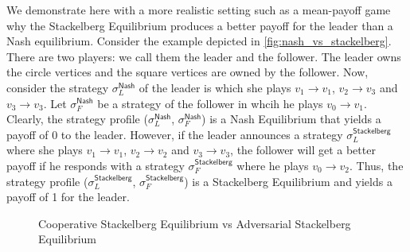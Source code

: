 We demonstrate here with a more realistic setting such as a mean-payoff game why the Stackelberg Equilibrium produces a better payoff for the leader than a Nash equilibrium. Consider the example depicted in \cref{fig:nash_vs_stackelberg}. There are two players: we call them the leader and the follower. The leader owns the circle vertices and the square vertices are owned by the follower. Now, consider the strategy $\sigma_L^{\mathsf{Nash}}$ of the leader is which she plays $v_1 \to v_1$, $v_2 \to v_3$ and $v_3 \to v_3$. Let $\sigma_F^{\mathsf{Nash}}$ be a strategy of the follower in whcih he plays $v_0 \to v_1$. Clearly, the strategy profile ($\sigma_L^{\mathsf{Nash}}$, $\sigma_F^{\mathsf{Nash}}$) is a Nash Equilibrium that yields a payoff of 0 to the leader. However, if the leader announces a strategy $\sigma_L^{\mathsf{Stackelberg}}$ where she plays $v_1 \to v_1$, $v_2 \to v_2$ and $v_3 \to v_3$, the follower will get a better payoff if he responds with a strategy $\sigma_F^{\mathsf{Stackelberg}}$ where he plays $v_0 \to v_2$. Thus, the strategy profile ($\sigma_L^{\mathsf{Stackelberg}}$, $\sigma_F^{\mathsf{Stackelberg}}$) is a Stackelberg Equilibrium and yields a payoff of 1 for the leader.

\begin{figure}
    \centering
    \caption{Cooperative Stackelberg Equilibrium vs Adversarial Stackelberg Equilibrium}
    \label{fig:cooperative_vs_adversarial}
\end{figure}

